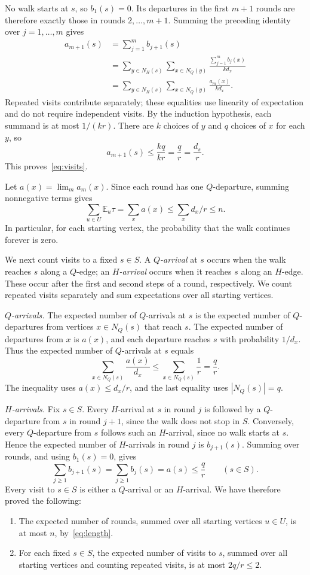 \documentclass[11pt]{amsart}
\theoremstyle{remark}
\newcommand{\E}{\mathbb E}
\begin{document}
No walk starts at $s$, so $b_1(s)=0$. Its departures in the first $m+1$ rounds are therefore exactly those in rounds $2,\ldots,m+1$. Summing the preceding identity over $j=1,\ldots,m$ gives
\[
\begin{aligned}
a_{m+1}(s)
&=\sum_{j=1}^{m}b_{j+1}(s)\\
&=\sum_{y\in N_H(s)}\sum_{x\in N_Q(y)}\frac{\sum_{j=1}^{m}b_j(x)}{k d_x}\\
&=\sum_{y\in N_H(s)}\sum_{x\in N_Q(y)}\frac{a_m(x)}{k d_x}.
\end{aligned}
\]
Repeated visits contribute separately; these equalities use linearity of expectation and do not require independent visits. By the induction hypothesis, each summand is at most $1/(kr)$. There are $k$ choices of $y$ and $q$ choices of $x$ for each $y$, so
\[
a_{m+1}(s)\le\frac{kq}{kr}=\frac qr=\frac{d_s}{r}.
\]
This proves~\eqref{eq:visits}.

Let $a(x)=\lim_m a_m(x)$. Since each round has one $Q$-departure, summing nonnegative terms gives
\begin{equation}\label{eq:length}
\sum_{u\in U}\E_u\tau=\sum_x a(x)\le\sum_x d_x/r\le n.
\end{equation}
In particular, for each starting vertex, the probability that the walk continues forever is zero.

We next count visits to a fixed $s\in S$. A \emph{$Q$-arrival} at $s$ occurs when the walk reaches $s$ along a $Q$-edge; an \emph{$H$-arrival} occurs when it reaches $s$ along an $H$-edge. These occur after the first and second steps of a round, respectively. We count repeated visits separately and sum expectations over all starting vertices.

\emph{$Q$-arrivals.} The expected number of $Q$-arrivals at $s$ is the expected number of $Q$-departures from vertices $x\in N_Q(s)$ that reach $s$. The expected number of departures from $x$ is $a(x)$, and each departure reaches $s$ with probability $1/d_x$. Thus the expected number of $Q$-arrivals at $s$ equals
\[
\sum_{x\in N_Q(s)}\frac{a(x)}{d_x}
\le\sum_{x\in N_Q(s)}\frac1r
=\frac qr.
\]
The inequality uses $a(x)\le d_x/r$, and the last equality uses $|N_Q(s)|=q$.

\emph{$H$-arrivals.} Fix $s\in S$. Every $H$-arrival at $s$ in round $j$ is followed by a $Q$-departure from $s$ in round $j+1$, since the walk does not stop in $S$. Conversely, every $Q$-departure from $s$ follows such an $H$-arrival, since no walk starts at $s$. Hence the expected number of $H$-arrivals in round $j$ is $b_{j+1}(s)$. Summing over rounds, and using $b_1(s)=0$, gives
\[
\sum_{j\ge1}b_{j+1}(s)=\sum_{j\ge1}b_j(s)=a(s)\le\frac qr
\qquad(s\in S).
\]
Every visit to $s\in S$ is either a $Q$-arrival or an $H$-arrival. We have therefore proved the following:
\begin{enumerate}
\item The expected number of rounds, summed over all starting vertices $u\in U$, is at most $n$, by~\eqref{eq:length}.
\item For each fixed $s\in S$, the expected number of visits to $s$, summed over all starting vertices and counting repeated visits, is at most $2q/r\le2$.
\end{enumerate}
\end{document}
